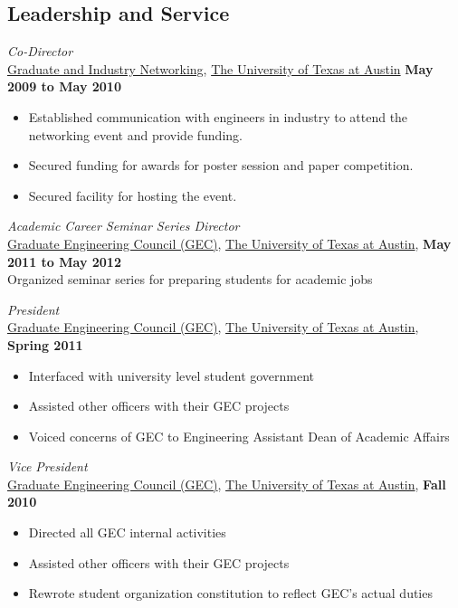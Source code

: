 \documentclass[centered]{res}
\begin{document}
\begin{resume}
\section{Leadership and Service}
\textit{Co-Director} \\
\href{http://gain.engr.utexas.edu/}{Graduate and Industry Networking},
\href{http://www.utexas.edu}{The University of Texas at Austin}
\hfill \textbf{May 2009 to May 2010}
\begin{itemize} \itemsep -2pt %
\item Established communication with engineers in industry to attend the networking event and provide funding.
\item Secured funding for awards for poster session and paper competition.
\item Secured facility for hosting the event.  
\end{itemize}

\textit{Academic Career Seminar Series Director} \\
\href{http://sites.google.com/site/utexasgecouncil/}{Graduate Engineering Council (GEC)},
\href{http://www.utexas.edu}{The University of Texas at Austin},
\hfill \textbf{May 2011 to May 2012} \\ 
Organized seminar series for preparing students for academic jobs

\textit{President} \\
\href{http://sites.google.com/site/utexasgecouncil/}{Graduate Engineering Council (GEC)},
\href{http://www.utexas.edu}{The University of Texas at Austin},
\hfill \textbf{Spring 2011}
\begin{itemize} \itemsep -2pt %
\item Interfaced with university level student government
\item Assisted other officers with their GEC projects
\item Voiced concerns of GEC to Engineering Assistant Dean of Academic
  Affairs 
\end{itemize}

\textit{Vice President} \\
\href{http://sites.google.com/site/utexasgecouncil/}{Graduate Engineering Council (GEC)},
\href{http://www.utexas.edu}{The University of Texas at Austin},
  \hfill \textbf{Fall 2010}
  \begin{itemize} \itemsep -2pt %
  \item Directed all GEC internal activities
  \item Assisted other officers with their GEC projects
  \item Rewrote student organization constitution to reflect GEC's actual duties
  \end{itemize}~


\end{resume}
\end{document}
